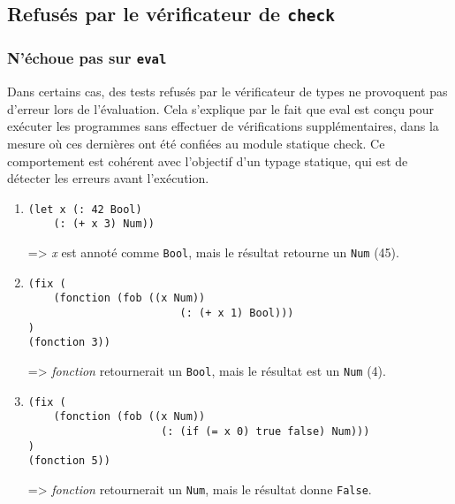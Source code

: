 \documentclass[a4paper,12pt]{article}
\begin{document}
    \subsection{Refusés par le vérificateur de \texttt{check}}
        \subsubsection{N'échoue pas sur \texttt{eval}}
        Dans certains cas, des tests refusés par le vérificateur de types ne provoquent pas d'erreur 
        lors de l'évaluation. Cela s'explique par le fait que eval est conçu pour exécuter les programmes 
        sans effectuer de vérifications supplémentaires, dans la mesure où ces dernières ont été confiées 
        au module statique check. Ce comportement est cohérent avec l'objectif d'un typage statique, qui est de 
        détecter les erreurs avant l'exécution. \\

        \begin{enumerate}
            \item \begin{lstlisting}
(let x (: 42 Bool) 
    (: (+ x 3) Num))
            \end{lstlisting}
            => \textit{x} est annoté comme \texttt{Bool}, mais le résultat retourne un \texttt{Num} (45).
        
            \item \begin{lstlisting}
(fix (
    (fonction (fob ((x Num)) 
                        (: (+ x 1) Bool)))
) 
(fonction 3))
            \end{lstlisting}
            => \textit{fonction} retournerait un \texttt{Bool}, mais le résultat est un \texttt{Num} (4).
        
            \item \begin{lstlisting}
(fix (
    (fonction (fob ((x Num)) 
                     (: (if (= x 0) true false) Num)))
) 
(fonction 5))
            \end{lstlisting}
            => \textit{fonction} retournerait un \texttt{Num}, mais le résultat donne \texttt{False}.
        \end{enumerate}
\end{document}
